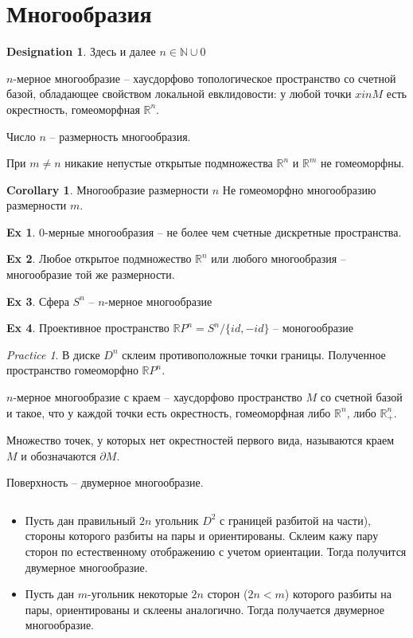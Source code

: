 \documentclass[11pt]{book}
\newcommand{\N}{\mathbb{N}}
\newcommand{\R}{\mathbb{R}}
\theoremstyle{definition}
\theoremstyle{plain}
\theoremstyle{plain}
\theoremstyle{definition}
\newtheorem*{ex}{Ex}
\newtheorem*{cor}{Corollary}
\newtheorem*{name}{Designation}
\theoremstyle{remark}
\newtheorem*{prac}{Practice}
\begin{document}
\section{Многообразия}
\begin{name}
    Здесь и далее $ n \in \N \cup 0$
\end{name}
\begin{defn}
    $ n$-мерное многообразие -- хаусдорфово топологическое пространство со счетной базой, обладающее свойством локальной евклидовости: у любой точки $ x in M$ есть окрестность, гомеоморфная  $ \R^{n}$.

    Число $ n$ -- размерность многообразия.
\end{defn}
\begin{thm}
    При $ m \ne n$ никакие непустые открытые подмножества $ \R^{n}$ и $ \R^{m}$ не гомеоморфны.
\end{thm}
\begin{cor}
    Многообразие размерности $ n$ Не гомеоморфно многообразию размерности $ m$.
\end{cor}
\begin{ex}
    $ 0$-мерные многообразия -- не более чем счетные дискретные пространства.
\end{ex}
\begin{ex}
    Любое открытое подмножество $ \R^{n}$ или любого многообразия -- многообразие той же размерности.
\end{ex}
\begin{ex}
    Сфера $ S^{n}$ -- $ n$-мерное многообразие
\end{ex}
\begin{ex}
Проективное пространство $ \R P^{n} = S^{n}/\{id, -id\}$ -- моногообразие
\end{ex}
\begin{prac}
    В диске $ D^{n}$ склеим противоположные точки границы. Полученное пространство гомеоморфно $ \R P^{n}$.
\end{prac}
\begin{defn}
    $ n$-мерное многообразие с краем -- хаусдорфово пространство $ M$ со счетной базой и такое, что у каждой точки есть окрестность, гомеоморфная либо  $ \R^{n}$, либо $ \R^{n}_+$.

    Множество точек, у которых нет окрестностей первого вида, называются краем $ M$ и обозначаются $\partial M$.
\end{defn}
\begin{defn}
    Поверхность -- двумерное многообразие.
\end{defn}
\begin{thm}
    $ $
    \begin{itemize}
	\item  Пусть дан правильный $ 2n$ угольник  $ D^{2}$ с границей разбитой на части), стороны которого разбиты на пары и ориентированы.
	   Склеим кажу пару сторон по естественному отображению с учетом ориентации.
	   Тогда получится двумерное многообразие.
       \item Пусть дан $ m$-угольник некоторые $ 2n $ сторон ($ 2n < m$) которого разбиты на пары, ориентированы и склеены аналогично. 
	   Тогда получается двумерное многообразие.
    \end{itemize}
\end{thm}
\end{document}
